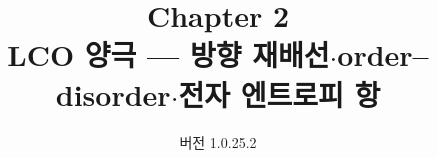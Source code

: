 

\renewcommand{\theequation}{2.\arabic{equation}}
\renewcommand{\thesection}{2.\arabic{section}}

\title{\textbf{\LARGE Chapter 2}\\[0.35em]\Large LCO 양극 --- 방향 재배선$\cdot$order--disorder$\cdot$전자 엔트로피 항}
\author{}
\date{\normalsize 버전 1.0.25.2}


\maketitle












